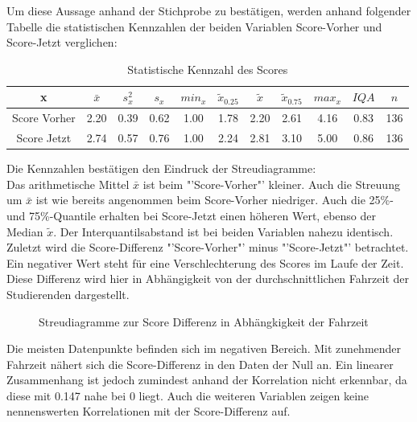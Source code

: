 \documentclass[11pt, a4paper]{article}
\begin{document}
Um diese Aussage anhand der Stichprobe zu bestätigen, werden anhand folgender Tabelle die statistischen Kennzahlen der beiden Variablen Score-Vorher und Score-Jetzt verglichen: 



\begin{table}[h]
	\begin{center}
	\vspace{0.2cm}
	\begin{tabular}{c|ccccccccc|c}
		x & $\bar{x}$ & $s_x^2$ & $s_x$ & $min_x$ & $\tilde{x}_{0.25}$ & $\tilde{x}$ & $\tilde{x}_{0.75}$ & $max_x$ & $IQA$ & $n$ \\ \hline
		Score Vorher & 2.20 & 0.39 & 0.62 & 1.00 & 1.78 & 2.20 & 2.61 & 4.16 & 0.83 & 136 \\
		Score Jetzt & 2.74 & 0.57 & 0.76 & 1.00 & 2.24 & 2.81 & 3.10 & 5.00 & 0.86 & 136
	\end{tabular}
	\vspace{0.2cm}
	\caption{Statistische Kennzahl des Scores}
\end{center}
\end{table}

	Die Kennzahlen bestätigen den Eindruck der Streudiagramme:\\
Das arithmetische Mittel $\bar{x}$ ist beim "'Score-Vorher"' kleiner.
Auch die Streuung um $\bar{x}$ ist wie bereits angenommen beim Score-Vorher niedriger. Auch die 25\%- und 75\%-Quantile erhalten bei Score-Jetzt einen höheren Wert, ebenso der Median $\tilde{x}$.
Der Interquantilsabstand ist bei beiden Variablen nahezu identisch. \\

Zuletzt wird die Score-Differenz "'Score-Vorher"' minus "'Score-Jetzt"' betrachtet. 
Ein negativer Wert steht für eine Verschlechterung des Scores im Laufe der Zeit.
Diese Differenz wird hier in Abhängigkeit von der durchschnittlichen Fahrzeit der Studierenden dargestellt.

	
\begin{figure}[h]
	{\centering 
		\vspace{-0.6cm}
		\caption{ Streudiagramme zur Score Differenz in Abhängkigkeit der Fahrzeit }}
		\vspace{0cm}
\end{figure}
Die meisten Datenpunkte befinden sich im negativen Bereich. Mit zunehmender Fahrzeit nähert sich die Score-Differenz in den Daten der Null an. Ein linearer Zusammenhang ist jedoch zumindest anhand der Korrelation nicht erkennbar, da diese mit 0.147 nahe bei 0 liegt. Auch die weiteren Variablen zeigen keine nennenswerten Korrelationen mit der Score-Differenz auf.
\end{document}
